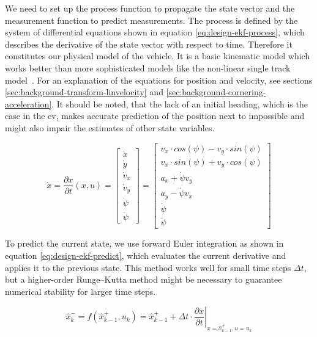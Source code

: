 We need to set up the process function to propagate the state vector and the measurement function to predict measurements. The process is defined by the system of differential equations shown in equation \ref{eq:design-ekf-process}, which describes the derivative of the state vector with respect to time. Therefore it constitutes our physical model of the vehicle. It is a basic kinematic model which works better than more sophisticated models like the non-linear single track model~\cite{AlexanderWischnewski.2019}. For an explanation of the equations for position and velocity, see sections \ref{sec:background-transform-linvelocity} and \ref{sec:background-cornering-acceleration}. It should be noted, that the lack of an initial heading, which is the case in the \gls{ev}, makes accurate prediction of the position next to impossible and might also impair the estimates of other state variables.

\begin{equation}\label{eq:design-ekf-process}%
\dot{x} = \frac{\partial x}{\partial t} (x, u)%
= \begin{bmatrix}\dot{x} \\ \dot{y} \\ \dot{v}_x \\ \dot{v}_y \\ \dot{\psi} \\ \ddot{\psi}\end{bmatrix}%
= \begin{bmatrix}v_x \cdot cos(\psi) - v_y \cdot sin(\psi) \\ v_x \cdot sin(\psi) + v_y \cdot cos(\psi) \\ a_x + \dot{\psi}v_y \\ a_y - \dot{\psi}v_x \\ \dot{\psi} \\ \ddot{\psi}\end{bmatrix}%
\end{equation}

To predict the current state, we use forward Euler integration as shown in equation \ref{eq:design-ekf-predict}, which evaluates the current derivative and applies it to the previous state. This method works well for small time steps $\Delta t$, but a higher-order Runge--Kutta method might be necessary to guarantee numerical stability for larger time steps. 

\begin{equation}\label{eq:design-ekf-predict}%
\hat{x}_k^- = f(\hat{x}_{k-1}^+, u_k) = \hat{x}_{k-1}^+ + \Delta t \cdot \left. \frac{\partial x}{\partial t} \right|_{x = \hat{x}_{k-1}^+, u=u_k}%
\end{equation}

